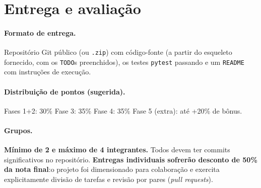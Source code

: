 \documentclass[11pt,a4paper]{article}
\begin{document}
\section*{Entrega e avaliação}

\paragraph{Formato de entrega.} Repositório Git público (ou \texttt{.zip}) com código-fonte (a partir do esqueleto fornecido, com os \texttt{TODO}s preenchidos), os testes \texttt{pytest} passando e um \texttt{README} com instruções de execução.

\paragraph{Distribuição de pontos (sugerida).} Fases 1+2: 30\% \quad Fase 3: 35\% \quad Fase 4: 35\% \quad Fase 5 (extra): até +20\% de bônus.

\paragraph{Grupos.} \textbf{Mínimo de 2 e máximo de 4 integrantes.} Todos devem ter commits significativos no repositório. \textbf{Entregas individuais sofrerão desconto de 50\% da nota final}:o projeto foi dimensionado para colaboração e exercita explicitamente divisão de tarefas e revisão por pares (\textit{pull requests}).
\end{document}
